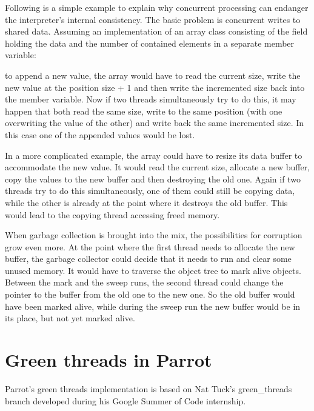 \documentclass[bachelor,english]{hgbthesis}
\begin{document}
Following is a simple example to explain why concurrent processing can endanger the interpreter's internal consistency. The basic problem is concurrent writes to shared data. Assuming an implementation of an array class consisting of the field holding the data and the number of contained elements in a separate member variable:
\begin{CCode}
pmclass ResizableIntegerArray auto_attrs provides array {
    ATTR INTVAL   size;      /* number of INTVALs stored in this array */
    ATTR INTVAL * int_array; /* INTVALs are stored here */
\end{CCode}
to append a new value, the array would have to read the current size, write the new value at the position size + 1 and then write the incremented size back into the member variable.
Now if two threads simultaneously try to do this, it may happen that both read the same size, write to the same position (with one overwriting the value of the other) and write back the same incremented size. In this case one of the appended values would be lost.

In a more complicated example, the array could have to resize its data buffer to accommodate the new value. It would read the current size, allocate a new buffer, copy the values to the new buffer and then destroying the old one. Again if two threads try to do this simultaneously, one of them could still be copying data, while the other is already at the point where it destroys the old buffer. This would lead to the copying thread accessing freed memory.

When garbage collection is brought into the mix, the possibilities for corruption grow even more. At the point where the first thread needs to allocate the new buffer, the garbage collector could decide that it needs to run and clear some unused memory. It would have to traverse the object tree to mark alive objects. Between the mark and the sweep runs, the second thread could change the pointer to the buffer from the old one to the new one. So the old buffer would have been marked alive, while during the sweep run the new buffer would be in its place, but not yet marked alive.

\section{Green threads in Parrot}

Parrot's green threads implementation is based on Nat Tuck's green\_threads branch developed during his Google Summer of Code internship.
\end{document}

